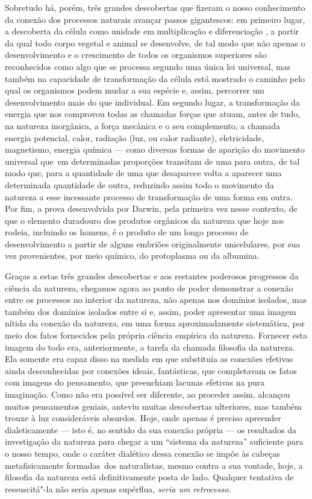 Sobretudo há, porém, três grandes descobertas que fizeram o nosso
conhecimento da conexão dos processos naturais avançar passos
gigantescos: em primeiro lugar, a descoberta da célula como unidade em
multiplicação \textbar{} e diferenciação \textbar{}, a partir da qual todo corpo vegetal
e animal se desenvolve, de tal modo que não apenas o desenvolvimento e
o crescimento de todos os organismos superiores são reconhecidos como
algo que se processa segundo uma única lei universal, \textbar{} mas também na
capacidade de transformação da célula está mostrado o caminho pelo qual
os organismos podem mudar a sua espécie e, assim, percorrer um
desenvolvimento mais do que individual. Em segundo lugar, \textbar{} a
transformação da energia que nos comprovou todas as chamadas forças que %
atuam, antes de tudo, na natureza inorgânica, a força mecânica e o seu
complemento, a chamada energia potencial, calor, radiação (luz, ou calor
radiante), eletricidade, magnetismo, energia química --- como diversas
formas de aparição do movimento universal que\est\ em determinadas
proporções transitam 
de uma para outra, de tal modo que, para a quantidade de uma que
desaparece volta a aparecer uma determinada quantidade de outra,
reduzindo assim todo o movimento da natureza a esse incessante processo
de transformação de uma forma em outra. Por fim, a prova desenvolvida por Darwin,
pela primeira vez nesse contexto,
de que o elemento duradouro dos produtos orgânicos da 
natureza que hoje nos rodeia, incluindo os homens, é o produto de um
longo processo de desenvolvimento a partir de alguns embriões
originalmente unicelulares, por sua vez provenientes, por meio químico, do protoplasma ou da albumina.

Graças a estas três grandes descobertas e aos restantes poderosos
progressos da ciência da natureza, chegamos agora ao ponto de poder
demonstrar a conexão entre os processos no interior da natureza, não
apenas nos domínios isolados, mas também dos domínios isolados entre si
e, assim, poder apresentar uma imagem nítida da conexão da natureza, em
uma forma aproximadamente sistemática, por meio dos fatos fornecidos
pela própria ciência empírica da natureza. Fornecer esta imagem do todo
era, anteriormente, a tarefa da chamada filosofia da natureza. Ela
somente era capaz disso na medida em que substituía as conexões
efetivas ainda desconhecidas por conexões ideais, fantásticas, que
completavam os fatos com imagens do pensamento, que preenchiam lacunas
efetivas na pura imaginação. Como não era possível ser diferente, ao
proceder assim, alcançou muitos pensamentos geniais, anteviu muitas
descobertas ulteriores, mas também trouxe à luz consideráveis absurdos.
Hoje, onde apenas é preciso apreender dialeticamente --- isto é, no sentido
da sua conexão própria --- os resultados da investigação da natureza para
chegar a um ``sistema da natureza'' suficiente para o nosso tempo, onde
o caráter dialético dessa conexão se impõe às cabeças metafisicamente
formadas\est\ dos naturalistas, mesmo contra a sua vontade, hoje, a filosofia
da natureza está definitivamente posta de lado. Qualquer tentativa de
ressuscitá"-la não seria apenas supérflua, \emph{seria um retrocesso.}

